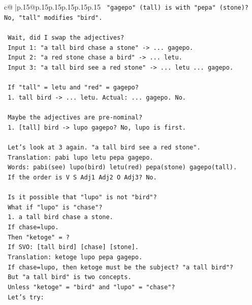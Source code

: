 \documentclass{article}
\begin{document}
{\begin{supertabular}{c@{$\;$}|p{.15\linewidth}@{}p{.15\linewidth}p{.15\linewidth}p{.15\linewidth}p{.15\linewidth}p{.15\linewidth}}
{{{\texttt{      "gagepo" (tall) is with "pepa" (stone)? No, "tall" modifies "bird".} \\
\\ 
\texttt{      Wait, did I swap the adjectives?} \\
\texttt{      Input 1: "a tall bird chase a stone" {-}> ... gagepo.} \\
\texttt{      Input 2: "a red stone chase a bird" {-}> ... letu.} \\
\texttt{      Input 3: "a tall bird see a red stone" {-}> ... letu ... gagepo.} \\
\\ 
\texttt{      If "tall" = letu and "red" = gagepo?} \\
\texttt{      1. tall bird {-}> ... letu. Actual: ... gagepo. No.} \\
\\ 
\texttt{      Maybe the adjectives are pre{-}nominal?} \\
\texttt{      1. {[}tall{]} bird {-}> lupo gagepo? No, lupo is first.} \\
\\ 
\texttt{      Let's look at 3 again. "a tall bird see a red stone".} \\
\texttt{      Translation: pabi lupo letu pepa gagepo.} \\
\texttt{      Words: pabi(see) lupo(bird) letu(red) pepa(stone) gagepo(tall).} \\
\texttt{      If the order is V S Adj1 Adj2 O Adj3? No.} \\
\\ 
\texttt{      Is it possible that "lupo" is not "bird"?} \\
\texttt{      What if "lupo" is "chase"?} \\
\texttt{      1. a tall bird chase a stone.} \\
\texttt{         If chase=lupo.} \\
\texttt{         Then "ketoge" = ?} \\
\texttt{         If SVO: {[}tall bird{]} {[}chase{]} {[}stone{]}.} \\
\texttt{         Translation: ketoge lupo pepa gagepo.} \\
\texttt{         If chase=lupo, then ketoge must be the subject? "a tall bird"?} \\
\texttt{         But "a tall bird" is two concepts.} \\
\texttt{         Unless "ketoge" = "bird" and "lupo" = "chase"?} \\
\texttt{         Let's try:} \\
}}}
\end{supertabular}}
\end{document}
